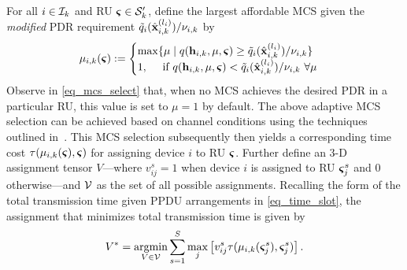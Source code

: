For all $i \in {\ensuremath{\mathcal I}}_k$ and RU $\boldsymbol{\varsigma} \in {\ensuremath{\mathcal S}}'_k$, define the largest affordable MCS given the \emph{modified} PDR requirement ${\tilde q}_i({\hat{\mathbf x} }^{(l_i)}_{i,k})/\nu_{i,k}$ by
 \begin{align}\label{eq_mcs_select}
 \mu_{i,k}(\bbsigma) := \begin{cases}
 \max \{\mu \mid q(\bbh_{i,k},\mu,\bbsigma) \geq \tdq_i(\hbx^{(l_i)}_{i,k})/\nu_{i,k}\} \\
 1,\quad  \text{ if } q(\bbh_{i,k},\mu,\bbsigma) < \tdq_i(\hbx^{(l_i)}_{i,k})/\nu_{i,k} \ \forall \mu
 \end{cases}
 \end{align}
Observe in \eqref{eq_mcs_select} that, when no MCS achieves the desired PDR in a particular RU, this value is set to $\mu=1$ by default. The above adaptive MCS selection can be achieved based on channel conditions using the techniques outlined in~\cite{hoefel2016application}. This MCS selection subsequently then yields a corresponding time cost $\tau(\mu_{i,k}(\boldsymbol{\varsigma}), \boldsymbol{\varsigma})$ for assigning device $i$ to RU $\boldsymbol{\varsigma}$. Further define an 3-D assignment tensor $V$---where $v^s_{ij}= 1$ when device $i$ is assigned to RU $\boldsymbol{\varsigma}^s_j$ and 0 otherwise---and ${\mathcal V}$ as the set of all possible assignments. Recalling the form of the total transmission time given PPDU arrangements in \eqref{eq_time_slot}, the assignment that minimizes total transmission time is given by
%
\begin{align}\label{eq_assignment}
V^* = \argmin_{V \in \ccalV} \sum_{s=1}^S \max_{j} \left[v^s_{ij} \tau(\mu_{i,k}(\bbsigma^s_j), \bbsigma_j^s)\right].
\end{align}
% 

